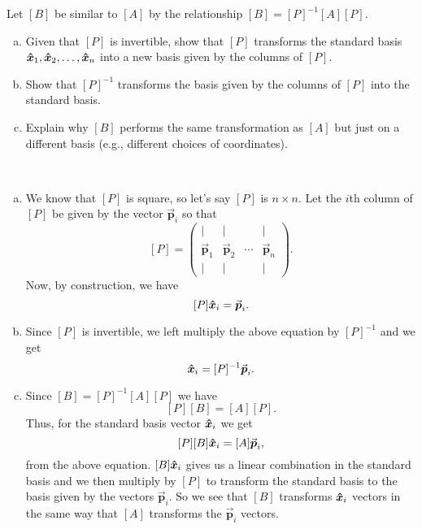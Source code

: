 \documentclass[12pt]{article} %
\newcommand{\vecp}{\vec{\boldsymbol{p}}}
\begin{document}
\newpage
\begin{problem}
Let $[B]$ be similar to $[A]$ by the relationship $[B]=[P]^{-1} [A] [P]$.
\begin{enumerate}[(a)]
    \item Given that $[P]$ is invertible, show that $[P]$ transforms the standard basis $\boldsymbol{\hat{x}}_1,\boldsymbol{\hat{x}}_2,\dots,\boldsymbol{\hat{x}}_n$ into a new basis given by the columns of $[P]$.
    \item Show that $[P]^{-1}$ transforms the basis given by the columns of $[P]$ into the standard basis.
    \item Explain why $[B]$ performs the same transformation as $[A]$ but just on a different basis (e.g., different choices of coordinates).
\end{enumerate}
\end{problem}
\begin{solution}~
    \begin{enumerate}[(a)]
        \item We know that $[P]$ is square, so let's say $[P]$ is $n\times n$. Let the $i$th column of $[P]$ be given by the vector $\vecp_i$ so that
        \[
        [P] = \begin{pmatrix} \vert & \vert & ~ & \vert \\ \vecp_1 & \vecp_2 & \cdots & \vecp_n \\ \vert & \vert & ~ & \vert \end{pmatrix}.
        \]
        Now, by construction, we have
        \[
        [P] \xhat_i = \vecp_i.
        \]
        \item Since $[P]$ is invertible, we left multiply the above equation by $[P]^{-1}$ and we get
        \[
        \xhat_i = [P]^{-1} \vecp_i.
        \]
        \item Since $[B]= [P]^{-1} [A] [P]$ we have
        \[
        [P][B] = [A] [P].
        \]
        Thus, for the standard basis vector $\boldsymbol{\hat{x}}_i$ we get
        \[
        [P][B] \xhat_i = [A] \vecp_i,
        \]
        from the above equation. $[B]\boldsymbol{\hat{x}}_i$ gives us a linear combination in the standard basis and we then multiply by $[P]$ to transform the standard basis to the basis given by the vectors $\vecp_i$.  So we see that $[B]$ transforms $\boldsymbol{\hat{x}}_i$ vectors in the same way that $[A]$ transforms the $\vecp_i$ vectors.
    \end{enumerate} 
\end{solution}
\end{document}
